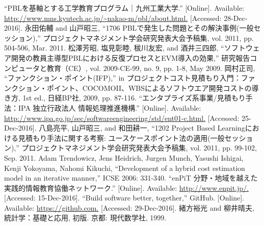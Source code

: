 \documentclass{compsoft}
\begin{document}
%
\begin{thebibliography}{99}
 ``PBLを基軸とする工学教育プログラム｜九州工業大学.'' [Online]. Available: \url{http://www.mns.kyutech.ac.jp/~nakao-m/pbl/about.html.} [Accessed: 28-Dec-2016].
 永田佑輔 and 山戸昭三, ``1706 PBLで発生した問題とその解決事例(一般セッション),'' プロジェクトマネジメント学会研究発表大会予稿集, vol. 2011, pp. 504-506, Mar. 2011.
 松澤芳昭, 塩見彰睦, 秡川友宏, and 酒井三四郎, ``ソフトウェア開発の教員主導型PBLにおける反復プロセスとEVM導入の効果,'' 研究報告コンピュータと教育（CE）, vol. 2009-CE-99, no. 9, pp. 1-8, May 2009.
 岡村正司, ``ファンクション・ポイント(IFP),'' in プロジェクトコスト見積もり入門：ファンクション・ポイント、COCOMOI\hspace{-1pt}I、WBSによるソフトウエア開発コストの導き方, 1st ed., 日経BP社, 2009, pp. 87-116.
 ``エンタプライズ系事業/見積もり手法：IPA 独立行政法人 情報処理推進機構.'' [Online]. Available: \url{http://www.ipa.go.jp/sec/softwareengineering/std/ent01-c.html.} [Accessed: 25-Dec-2016].
 八島亮平, 山戸昭三, and 和田耕一, ``1202 Project Based Learningにおける見積もり手法に関する考察: ユースケースポイント法の適用(一般セッション),'' プロジェクトマネジメント学会研究発表大会予稿集, vol. 2011, pp. 99-102, Sep. 2011. 
 Adam Trendowicz, Jens Heidrich, Jurgen Munch, Yasushi Ishigai, Kenji Yokoyama, Nahomi Kikuchi, ``Development of a hybrid cost estimation model in an iterative manner,'' ICSE 2006: 331-340.
 ``enPiT 分野・地域を越えた実践的情報教育協働ネットワーク.'' [Online]. Available: \url{http://www.enpit.jp/.} [Accessed: 15-Dec-2016].
 ``Build software better, together,'' GitHub. [Online]. Available: \url{https://github.com.} [Accessed: 29-Dec-2016].
 緒方裕光 and 柳井晴夫, 統計学：基礎と応用, 初版. 京都: 現代数学社, 1999.
\end{thebibliography}
\end{document}
